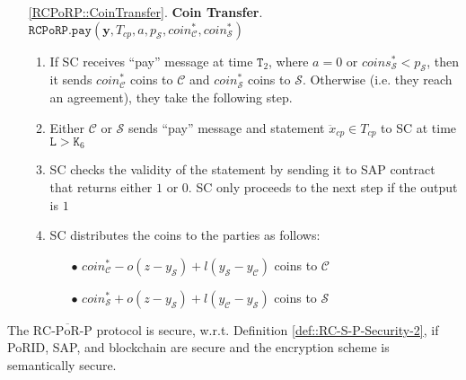 \begin{enumerate}
\item[\ref{RCPoRP::CoinTransfer}.] \textbf{Coin Transfer}. \label{RCPoRP::CoinTransfer2} $\mathtt{\mathtt{RCPoRP}}.\mathtt{pay}(\bm{y},T_{\scriptscriptstyle cp},a,p_{\scriptscriptstyle\mathcal S}, coin^{\scriptscriptstyle *}_{\scriptscriptstyle\mathcal C},coin^{\scriptscriptstyle *}_{\scriptscriptstyle\mathcal S})$
\begin{enumerate}


 \item If SC  receives  ``pay'' message  at time $\texttt{T}_{\scriptscriptstyle 2}$, where $a=0$ or $coins^{\scriptscriptstyle *}_{\scriptscriptstyle\mathcal{S}}<p_{\scriptscriptstyle\mathcal{S}}$, then it sends $coin^{\scriptscriptstyle *}_{\scriptscriptstyle\mathcal C}$ coins to $\mathcal C$ and $coin^{\scriptscriptstyle *}_{\scriptscriptstyle\mathcal S}$ coins to $\mathcal S$. Otherwise (i.e. they reach an agreement), they take the following step. 

\item Either $\mathcal C$ or $\mathcal S$ sends ``pay'' message and  statement $\ddot{x}_{\scriptscriptstyle cp}\in T_{\scriptscriptstyle cp}$ to SC at time $\texttt{L}>\texttt{K}_{\scriptscriptstyle 6}$
\item SC checks the validity of the statement by sending it  to SAP contract that  returns  either $1$ or $0$. SC only proceeds to the next step if the output is $1$
\item SC distributes the coins to the parties as follows:

\begin{itemize}
\item[$\bullet$]   $coin^{\scriptscriptstyle *}_{\scriptscriptstyle\mathcal C}-o(z-y_{\scriptscriptstyle\mathcal S})+l(y_{\scriptscriptstyle\mathcal S}-y_{\scriptscriptstyle\mathcal C})$ coins  to $\mathcal C$

\item[$\bullet$] $coin^{\scriptscriptstyle *}_{\scriptscriptstyle\mathcal S}+o(z-y_{\scriptscriptstyle\mathcal S})+l( y_{\scriptscriptstyle\mathcal C}-y_{\scriptscriptstyle\mathcal S})$ coins to $\mathcal S$

 
\end{itemize}

\end{enumerate}
\end{enumerate}


\begin{theorem}
The ${\text{RC-}\overline{\text{PoR}}\text{-P}}$ protocol is secure, w.r.t. Definition \ref{def::RC-S-P-Security-2}, if PoRID, SAP, and blockchain are secure and the encryption scheme is semantically secure. 
\end{theorem}


